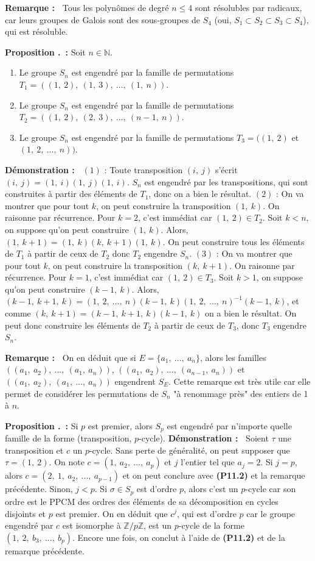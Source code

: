 \documentclass[5pt,a4paper]{article}
\newcounter{prop}[section]
\renewcommand{\theprop}{\thesection.\arabic{prop}}
\newcommand{\prop}[1]{\stepcounter{prop}\noindent\textbf{Proposition \theprop ~:} #1 \newline}
\newcommand{\propEnum}[1]{\stepcounter{prop}\noindent\textbf{Proposition \theprop ~:} #1}
\newcommand{\demo}[1]{\textbf{Démonstration :~} #1 \newline}
\newcommand{\rmq}[1]{\textbf{Remarque :~} #1 \newline}
\begin{document}
\begin{onehalfspacing}
\rmq{Tous les polynômes de degré $n \leq 4$ sont résolubles par radicaux, car leurs groupes de Galois sont des sous-groupes de $S_4$ (oui, $S_1 \subset S_2 \subset S_3 \subset S_4$), qui est résoluble.}


\propEnum{Soit $n \in \mathbb{N}$. 
	\begin{enumerate}
	\item Le groupe $S_n$ est engendré par la famille de permutations $T_1 = ((1,~2),~(1,~3),~...,~(1,~n))$.
	\item Le groupe $S_n$ est engendré par la famille de permutations $T_2 = ((1,~2),~(2,~3),~...,~(n-1,~n))$.
	\item Le groupe $S_n$ est engendré par la famille de permutations $T_3 = ((1,~2)$ et $(1,~2,~...,~n))$.
	\end{enumerate}
}
\demo{$(1)$ : Toute transposition $(i,~j)$ s'écrit $(i,~j) = (1,~i)(1,~j)(1,~i)$. $S_n$ est engendré par les transpositions, qui sont construites à partir des éléments de $T_1$, donc on a bien le résultat. $(2)$ : On va montrer que pour tout $k$, on peut construire la transposition $(1,~k)$. On raisonne par récurrence. Pour $k = 2$, c'est immédiat car $(1,~2) \in T_2$. Soit $k < n$, on suppose qu'on peut construire $(1,~k)$. Alors, $(1,~k+1) = (1,~k)(k,~k+1)(1,~k)$. On peut construire tous les éléments de $T_1$ à partir de ceux de $T_2$ donc $T_2$ engendre $S_n$. $(3)$ : On va montrer que pour tout $k$, on peut construire la transposition $(k,~k+1)$. On raisonne par récurrence. Pour $k = 1$, c'est immédiat car $(1,~2) \in T_3$. Soit $k > 1$, on suppose qu'on peut construire $(k-1,~k)$. Alors, $(k-1,~k+1,~k) = (1,~2,~...,~n)(k-1,~k)(1,~2,~...,~n)^{-1}(k-1,~k)$, et comme $(k,~k+1) = (k-1,~k+1,~k)(k-1,~k)$ on a bien le résultat. On peut donc construire les éléments de $T_2$ à partir de ceux de $T_3$, donc $T_3$ engendre $S_n$.}

\rmq{On en déduit que si $E = \{a_1,~...,~a_n\}$, alors les familles $((a_1,~a_2),~...,~(a_1,~a_n))$, $((a_1,~a_2),~...,~(a_{n-1},~a_n))$ et $((a_1,~a_2),~(a_1,~...,~a_n))$ engendrent $S_E$. Cette remarque est très utile car elle permet de considérer les permutations de $S_n$ "à renommage près" des entiers de 1 à $n$.}


\prop{Si $p$ est premier, alors $S_p$ est engendré par n'importe quelle famille de la forme (transposition, $p$-cycle).}
\demo{Soient $\tau$ une transposition et $c$ un $p$-cycle. Sans perte de généralité, on peut supposer que $\tau = (1,~2)$. On note $c = (1,~a_2,~...,~a_p)$ et $j$ l'entier tel que $a_j = 2$. Si $j = p$, alors $c = (2,~1,~a_2,~...,~a_{p-1})$ et on peut conclure avec \textbf{(P11.2)} et la remarque précédente. Sinon, $j < p$. Si $\sigma \in S_p$ est d'ordre $p$, alors c'est un $p$-cycle car son ordre est le PPCM des ordres des éléments de sa décomposition en cycles disjoints et $p$ est premier. On en déduit que $c^j$, qui est d'ordre $p$ car le groupe engendré par $c$ est isomorphe à $\mathbb{Z}/p\mathbb{Z}$, est un $p$-cycle de la forme $(1,~2,~b_3,~...,~b_p)$. Encore une fois, on conclut à l'aide de \textbf{(P11.2)} et de la remarque précédente.}



\end{onehalfspacing}
\end{document}
